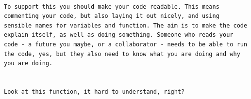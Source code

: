 \documentclass[]{book}
\begin{document}
\begin{verbatim}
                                                                                                                                                                                                                                                          To support this you should make your code readable. This means commenting your code, but also laying it out nicely, and using sensible names for variables and function. The aim is to make the code explain itself, as well as doing something. Someone who reads your code - a future you maybe, or a collaborator - needs to be able to run the code, yes, but they also need to know what you are doing and why you are doing. 
                                                                                                                                                                                                                                                          
                                                                                                                                                                                                                                                          Look at this function, it hard to understand, right?
                                                                                                                                                                                                                                                            
                                                                                                                                                                                                                                                            
                                                                                                                                                                                                                                                            

\end{verbatim}
\end{document}
